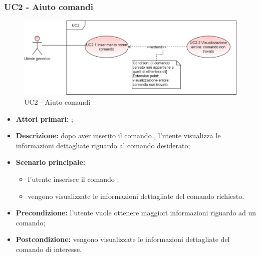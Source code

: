 \subsubsection{UC2 - Aiuto comandi}
	\begin{figure}[h]
		\centering
		\includegraphics[scale=\ucs]{./res/img/UC2.png}
		\caption {UC2 - Aiuto comandi}
	\end{figure}
	\begin{itemize}
		\item \textbf{Attori primari:} \ug{};
		\item \textbf{Descrizione:} dopo aver inserito il comando \help{}, l’utente visualizza le informazioni dettagliate riguardo al comando desiderato;  
		\item \textbf{Scenario principale:} 
		\begin{itemize}
			\item l’utente inserisce il comando \phelp{};
			\item vengono visualizzate le informazioni dettagliate del comando richiesto. 
		\end{itemize}
		\item \textbf{Precondizione:} l’utente vuole ottenere maggiori informazioni riguardo ad un comando;
		\item \textbf{Postcondizione:} vengono visualizzate le informazioni dettagliate del comando di interesse.  
	\end{itemize}
